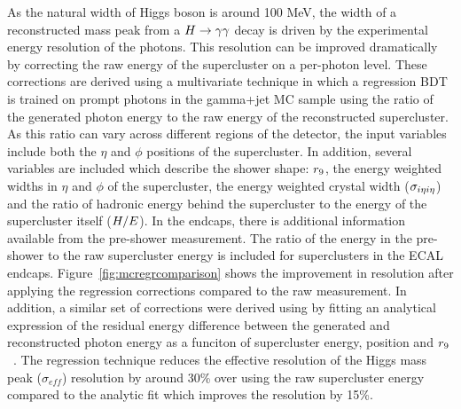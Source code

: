 As the natural width of Higgs boson is around 100 MeV, the width of a reconstructed mass peak from 
a $H\rightarrow\gamma\gamma$ decay is driven by the experimental energy resolution of the photons.
This resolution can be improved dramatically by correcting the raw energy of the supercluster 
on a per-photon level. These corrections are derived using a multivariate technique 
in which a regression BDT is trained on prompt photons in the gamma+jet MC sample using the 
ratio of the generated photon energy to the raw energy of the reconstructed supercluster.
As this ratio can vary across different regions of the detector, the input variables include both the 
$\eta$ and $\phi$ positions of the supercluster. In addition, several variables are included which 
describe the shower shape: $r_{9}$, the energy weighted widths in $\eta$ and $\phi$ of the supercluster,
the energy weighted crystal width ($\sigma_{i\eta i\eta}$) and the ratio of hadronic energy behind the supercluster
to the energy of the supercluster itself ($H/E$). In the endcaps, there is additional information 
available from the pre-shower measurement. The ratio of the energy in the pre-shower to the raw supercluster energy
is included for superclusters in the ECAL endcaps. Figure~\ref{fig:mcregrcomparison} shows the improvement
in resolution after applying the regression corrections compared to the raw measurement.
In addition, a similar set of corrections were derived using by fitting an analytical expression 
of the residual energy difference between the 
generated and reconstructed photon energy as a funciton of supercluster energy, position and $r_{9}$~\citep{AN-11-343}. 
The regression technique reduces the effective resolution of the Higgs mass peak ($\sigma_{eff}$) 
resolution by around 30\% over using the raw supercluster energy compared to the analytic fit which
improves the resolution by 15\%. 

